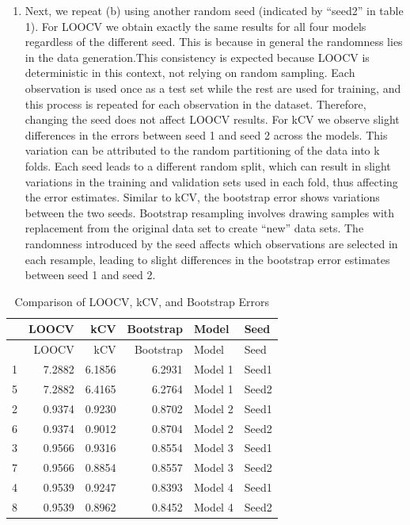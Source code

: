 \documentclass[
]{article}
\providecommand{\tightlist}{%
  \setlength{\itemsep}{0pt}\setlength{\parskip}{0pt}}
\begin{document}
\begin{enumerate}
\def\labelenumi{(\alph{enumi})}
\setcounter{enumi}{2}
\tightlist
\item
  Next, we repeat (b) using another random seed (indicated by ``seed2''
  in table 1). For LOOCV we obtain exactly the same results for all four
  models regardless of the different seed. This is because in general
  the randomness lies in the data generation.This consistency is
  expected because LOOCV is deterministic in this context, not relying
  on random sampling. Each observation is used once as a test set while
  the rest are used for training, and this process is repeated for each
  observation in the dataset. Therefore, changing the seed does not
  affect LOOCV results. For kCV we observe slight differences in the
  errors between seed 1 and seed 2 across the models. This variation can
  be attributed to the random partitioning of the data into k folds.
  Each seed leads to a different random split, which can result in
  slight variations in the training and validation sets used in each
  fold, thus affecting the error estimates. Similar to kCV, the
  bootstrap error shows variations between the two seeds. Bootstrap
  resampling involves drawing samples with replacement from the original
  data set to create ``new'' data sets. The randomness introduced by the
  seed affects which observations are selected in each resample, leading
  to slight differences in the bootstrap error estimates between seed 1
  and seed 2.
\end{enumerate}

\begin{longtable}[]{@{}lrrrll@{}}
\caption{Comparison of LOOCV, kCV, and Bootstrap Errors}\tabularnewline
\toprule()
& LOOCV & kCV & Bootstrap & Model & Seed \\
\midrule()
\endfirsthead
\toprule()
& LOOCV & kCV & Bootstrap & Model & Seed \\
\midrule()
\endhead
1 & 7.2882 & 6.1856 & 6.2931 & Model 1 & Seed1 \\
5 & 7.2882 & 6.4165 & 6.2764 & Model 1 & Seed2 \\
2 & 0.9374 & 0.9230 & 0.8702 & Model 2 & Seed1 \\
6 & 0.9374 & 0.9012 & 0.8704 & Model 2 & Seed2 \\
3 & 0.9566 & 0.9316 & 0.8554 & Model 3 & Seed1 \\
7 & 0.9566 & 0.8854 & 0.8557 & Model 3 & Seed2 \\
4 & 0.9539 & 0.9247 & 0.8393 & Model 4 & Seed1 \\
8 & 0.9539 & 0.8962 & 0.8452 & Model 4 & Seed2 \\
\bottomrule()
\end{longtable}
\end{document}
